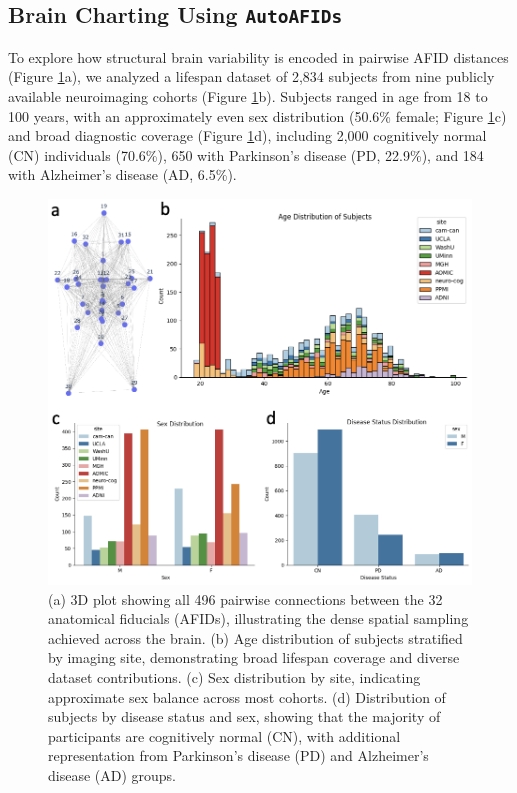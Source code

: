 \subsection{Brain Charting Using \texttt{AutoAFIDs}}

To explore how structural brain variability is encoded in pairwise AFID distances (Figure \ref{fig:ch3_Figure_pairwisedata}a), we analyzed a lifespan dataset of 2,834 subjects from nine publicly available neuroimaging cohorts (Figure \ref{fig:ch3_Figure_pairwisedata}b). Subjects ranged in age from 18 to 100 years, with an approximately even sex distribution (50.6\% female; Figure \ref{fig:ch3_Figure_pairwisedata}c) and broad diagnostic coverage (Figure \ref{fig:ch3_Figure_pairwisedata}d), including 2,000 cognitively normal (CN) individuals (70.6\%), 650 with Parkinson’s disease (PD, 22.9\%), and 184 with Alzheimer’s disease (AD, 6.5\%).

\begin{figure}[hbt!]
    \centering
    \includegraphics[width=1\linewidth]{figs/ch3_Figure_pairwisedata.png}
    \caption{(a) 3D plot showing all 496 pairwise connections between the 32 anatomical fiducials (AFIDs), illustrating the dense spatial sampling achieved across the brain. (b) Age distribution of subjects stratified by imaging site, demonstrating broad lifespan coverage and diverse dataset contributions. (c) Sex distribution by site, indicating approximate sex balance across most cohorts. (d) Distribution of subjects by disease status and sex, showing that the majority of participants are cognitively normal (CN), with additional representation from Parkinson’s disease (PD) and Alzheimer’s disease (AD) groups.
}
    \label{fig:ch3_Figure_pairwisedata}
\end{figure}


